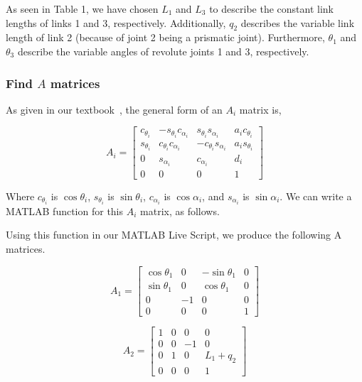 \documentclass[conference]{IEEEtran}
\begin{document}
As seen in Table 1, we have chosen $L_1$ and $L_3$ to describe the constant link
lengths of links 1 and 3, respectively. Additionally, $q_2$ describes the variable
link length of link 2 (because of joint 2 being a prismatic joint).
Furthermore, $\theta_1$ and $\theta_3$ describe the
variable angles of revolute joints 1 and 3, respectively.

\subsubsection{Find $A$ matrices}

As given in our textbook~\cite{Spong2006}, the general form of an
$A_i$ matrix is,

\[
    A_i =
    \begin{bmatrix}
        c_{\theta_i} & -s_{\theta_i}c_{\alpha_i} & s_{\theta_i}s_{\alpha_i} & a_i c_{\theta_i}\\
        s_{\theta_i} & c_{\theta_i}c_{\alpha_i} & -c_{\theta_i}s_{\alpha_i} & a_i s_{\theta_i}\\
        0 & s_{\alpha_i} & c_{\alpha_i} & d_i\\
        0 & 0 & 0 & 1
    \end{bmatrix}
\]

Where $c_{\theta_i}$ is $\cos{\theta_i}$, $s_{\theta_i}$ is $\sin{\theta_i}$,
$c_{\alpha_i}$ is $\cos{\alpha_i}$, and $s_{\alpha_i}$ is $\sin{\alpha_i}$.
We can write a MATLAB function for this $A_i$ matrix, as follows.



Using this function in our MATLAB Live Script, we produce the following A matrices.

\[
    A_1 =
    \begin{bmatrix}
        \cos \theta_1 & 0 & -\sin \theta_1 & 0\\
        \sin \theta_1 & 0 & \cos  \theta_1 & 0\\
        0 & -1 & 0 & 0\\
        0 & 0 & 0 & 1
        \end{bmatrix}
\]

\[
    A_2 = 
    \begin{bmatrix}
        1 & 0 & 0 & 0\\
        0 & 0 & -1 & 0\\
        0 & 1 & 0 & L_1 + q_2 \\
        0 & 0 & 0 & 1
        \end{bmatrix}
\]
\end{document}
